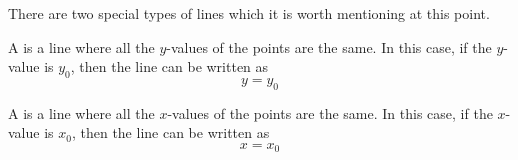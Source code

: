 \documentclass[nooutcomes]{ximera}
\begin{document}
There are two special types of lines which it is worth mentioning at this point.   


\begin{definition}
A  is a line where all the $y$-values of the points are the same.  In this case, if the $y$-value is $y_0$, then the line can be written as 
$$y=y_0$$
\begin{center}
\end{center}
\end{definition}



\begin{definition}
A  is a line where all the $x$-values of the points are the same.  In this case, if the $x$-value is $x_0$, then the line can be written as 
$$x=x_0$$
\begin{center}
\end{center}
\end{definition}
\end{document}
